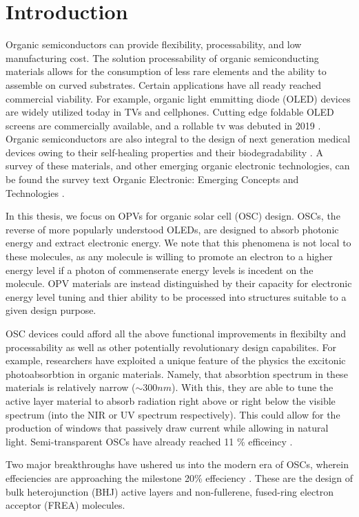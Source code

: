 \chapter{Introduction} 

Organic semiconductors can provide flexibility, processability, and low manufacturing cost. 
The solution processability of organic semiconducting materials allows for the consumption of less rare elements
and the ability to assemble on curved substrates. Certain applications have all ready reached commercial
viability.  
For example, organic light emmitting diode (OLED) devices are widely utilized today in TVs and cellphones.  
Cutting edge foldable OLED screens are commercially available, and a rollable tv was debuted in 2019
\cite{Chen2020}. 
Organic semiconductors are also integral to the design of next generation medical devices owing to their
self-healing properties and their biodegradability \cite{Bettinger2010}. 
A survey of these materials, and 
other emerging organic electronic technologies, can be found the survey text 
Organic Electronic: Emerging Concepts and Technologies
\cite{FabioCicoiraEditor2013}. 

In this thesis, we focus on OPVs for organic solar cell (OSC) design. 
OSCs, the reverse of more popularly understood OLEDs,
are designed to absorb photonic energy and extract electronic energy. 
We note that this phenomena is not
local to these molecules, as any molecule is willing to promote an electron to a higher energy level if a
photon of commenserate energy levels is incedent on the molecule. OPV materials are instead distinguished by
their capacity for electronic energy level 
tuning and thier ability to be processed into structures suitable to a given design purpose.

OSC devices could afford all the above functional improvements in flexibilty and processability as well as other
potentially revolutionary design capabilites.  
For example, researchers have exploited a unique feature of the physics the excitonic photoabsorbtion in 
organic materials. Namely, that absorbtion spectrum
in these materials is relatively narrow (${\sim}300nm$).
With this, they are able to tune the active layer material to absorb radiation right above or right below the
visible spectrum (into the NIR or UV spectrum respectively). This 
could allow for the production of windows that passively draw current while allowing in natural light. Semi-transparent OSCs have already
reached 11 \% efficeincy \cite{Brabec2020}. 

Two major breakthroughs have ushered us into the modern era of OSCs,
wherein effeciencies are approaching the milestone 20\% effeciency \cite{Liu2020b}.
These are the design of bulk heterojunction (BHJ) active layers and non-fullerene, fused-ring electron
acceptor (FREA) molecules. 

